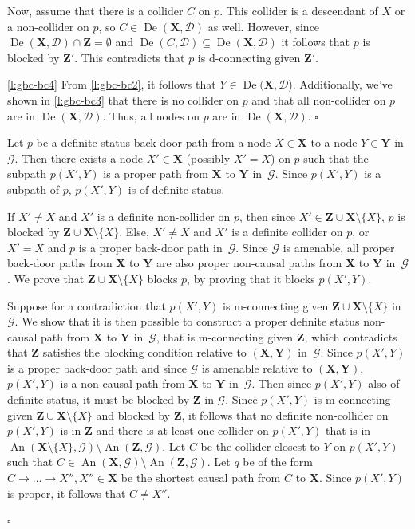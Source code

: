 \documentclass[11pt,a4paper]{article}
\newenvironment{proofof}[1][]{\begin{trivlist}
   \item[\hskip \labelsep {\bfseries Proof of #1.}]}{\hfill{}$\square$\end{trivlist}}
\DeclareMathOperator{\De}{De}
\DeclareMathOperator{\An}{An}
\newcommand{\blck}{the blocking condition\xspace}
\newcommand{\g}[1][G]{\mathcal{#1}}
\begin{document}
\begin{proofof}[Lemma~\ref{lemma:gbc bc}]
Now, assume that there is a collider $C$ on $p$. This collider is a descendant of $X$ or a non-collider on $p$, so $C \in \De(\mathbf{X}, \g[D])$ as well.
However, since $\De(\mathbf{X},\g[D]) \cap \mathbf{Z} =  \emptyset$ and $\De(C,\g[D]) \subseteq \De(\mathbf{X},\g[D])$ it follows that $p$ is blocked by $\mathbf{Z'}$. This contradicts that $p$ is d-connecting given $\mathbf{Z'}$.

\ref{l:gbc-bc4} From \ref{l:gbc-bc2}, it follows that $Y \in \De(\mathbf{X},\g[D]$). Additionally, we've shown in \ref{l:gbc-bc3} that there is no collider on $p$ and that all non-collider on $p$ are in $\De(\mathbf{X},\g[D])$. Thus, all nodes on $p$ are in $\De(\mathbf{X},\g[D])$.
\end{proofof}

\begin{proofof}[Lemma~\ref{lemma:adjust xy gbc cond 2}]
Let $p$ be a definite status back-door path from a node $X \in \mathbf{X}$ to a node $Y \in \mathbf{Y}$ in~$\g$.
Then there exists a node $X' \in \mathbf{X}$ (possibly $X'=X$) on $p$ such that the subpath $p(X',Y)$ is a proper path from $\mathbf{X}$ to $\mathbf{Y}$ in~$\g$. Since $p(X',Y)$ is a subpath of $p$, $p(X',Y)$ is of definite status.

If $X' \neq X$ and $X'$ is a definite non-collider on $p$, then since $X' \in \mathbf{Z} \cup \mathbf{X} \setminus \{X\}$, $p$ is blocked by $\mathbf{Z} \cup \mathbf{X} \setminus \{X\}$.
Else, $X' \neq X$ and $X'$ is a definite collider on $p$, or $X'=X$ and $p$ is a proper back-door path in~$\g$. Since $\g$ is amenable, all proper back-door paths from $\mathbf{X}$ to $\mathbf{Y}$ are also proper non-causal paths from $\mathbf{X}$ to $\mathbf{Y}$ in~$\g$.
We prove that $\mathbf{Z} \cup \mathbf{X} \setminus \{X\}$ blocks $p$, by proving that it blocks $p(X',Y)$.

Suppose for a contradiction that $p(X',Y)$ is m-connecting given $\mathbf{Z} \cup \mathbf{X} \setminus \{X\}$ in~$\g$.
We show that it is then possible to construct a proper definite status non-causal path from $\mathbf{X}$ to $\mathbf{Y}$ in~$\g$, that is m-connecting given $\mathbf{Z}$, which contradicts that $\mathbf{Z}$ satisfies \blck{} relative to $(\mathbf{X,Y})$ in~$\g$.
Since $p(X',Y)$ is a proper back-door path and since $\g$ is amenable relative to $(\mathbf{X,Y})$, $p(X',Y)$ is a non-causal path from $\mathbf{X}$ to $\mathbf{Y}$ in~$\g$. Then since $p(X',Y)$ also of definite status, it must be blocked by $\mathbf{Z}$ in $\g$.
Since $p(X',Y)$ is m-connecting given $\mathbf{Z} \cup \mathbf{X} \setminus \{X\}$ and blocked by $\mathbf{Z}$, it follows that no definite non-collider on $p(X',Y)$ is in $\mathbf{Z}$ and there is at least one collider on $p(X',Y)$ that is in $\An(\mathbf{X} \setminus \{X\},\g) \setminus \An(\mathbf{Z},\g)$. Let $C$ be the collider closest to $Y$ on $p(X',Y)$ such that $C \in \An(\mathbf{X},\g) \setminus \An(\mathbf{Z},\g)$.
Let $q$ be of the form $C \rightarrow \dots \rightarrow X'',X'' \in \mathbf{X}$ be the shortest causal path from $C$ to $\mathbf{X}$.
Since $p(X',Y)$ is proper, it follows that $C \neq X''$.


\end{proofof}
\end{document}
